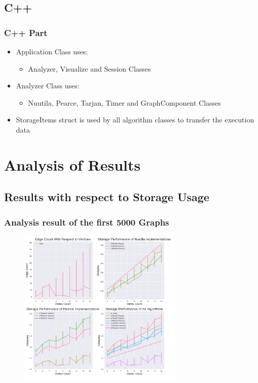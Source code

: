 \documentclass{beamer}
\begin{document}
		\subsection{C++}
		\begin{frame}
			\frametitle{C++ Part}
			\begin{itemize}
				\item <1-6> Application Class uses:
				\begin{itemize}
					\item <2-6> Analyzer, Visualize and Session Classes
				\end{itemize}
				\item <3-6> Analyzer Class uses:
				\begin{itemize}
					\item <4-6> Nuutila, Pearce, Tarjan, Timer and GraphComponent Classes
				\end{itemize}
				\item <5-6> StorageItems struct is used by all algorithm classes to transfer the execution data 
			\end{itemize}
		\end{frame}
	\section{Analysis of Results}
			\subsection{Results with respect to Storage Usage}
			\begin{frame}
				\frametitle{Analysis result of the first 5000 Graphs}
					\begin{figure}[h!]
					\centering
					\includegraphics[width=0.7\textwidth]{S5000}
					\end{figure}
			\end{frame}
			
\end{document}
